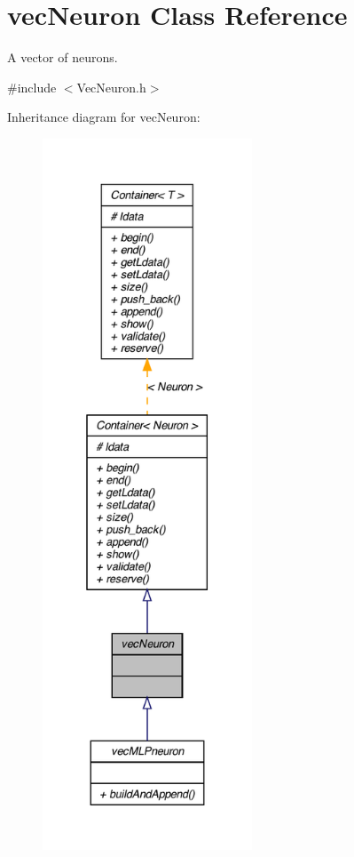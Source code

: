\hypertarget{classvec_neuron}{
\section{vecNeuron Class Reference}
\label{classvec_neuron}
}


A vector of neurons.  




{\ttfamily \#include $<$VecNeuron.h$>$}



Inheritance diagram for vecNeuron:
\nopagebreak
\begin{figure}[H]
\begin{center}
\leavevmode
\includegraphics[height=600pt]{classvec_neuron__inherit__graph}
\end{center}
\end{figure}


